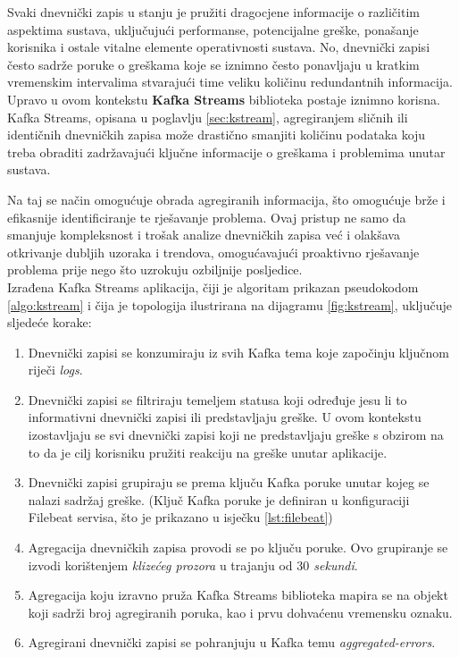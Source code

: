 \documentclass[times, utf8, diplomski]{fer}
\begin{document}
Svaki dnevnički zapis u stanju je pružiti dragocjene informacije o različitim aspektima sustava, uključujući performanse, potencijalne greške, ponašanje korisnika i ostale vitalne elemente operativnosti sustava. No, dnevnički zapisi često sadrže poruke o greškama koje se iznimno često ponavljaju u kratkim vremenskim intervalima stvarajući time veliku količinu redundantnih informacija.\\

Upravo u ovom kontekstu \textbf{Kafka Streams} biblioteka postaje iznimno korisna. Kafka Streams, opisana u poglavlju \ref{sec:kstream}, agregiranjem sličnih ili identičnih dnevničkih zapisa može drastično smanjiti količinu podataka koju treba obraditi zadržavajući ključne informacije o greškama i problemima unutar sustava.

Na taj se način omogućuje obrada agregiranih informacija, što omogućuje brže i efikasnije identificiranje te rješavanje problema. Ovaj pristup ne samo da smanjuje kompleksnost i trošak analize dnevničkih zapisa već i olakšava otkrivanje dubljih uzoraka i trendova, omogućavajući proaktivno rješavanje problema prije nego što uzrokuju ozbiljnije posljedice.\\

Izrađena Kafka Streams aplikacija, čiji je algoritam prikazan pseudokodom \ref{algo:kstream} i čija je topologija ilustrirana na dijagramu \ref{fig:kstream}, uključuje sljedeće korake:

\begin{enumerate}
	\item Dnevnički zapisi se konzumiraju iz svih Kafka tema koje započinju ključnom riječi \emph{\glqq logs\grqq}.
	\item Dnevnički zapisi se filtriraju temeljem statusa koji određuje jesu li to informativni dnevnički zapisi ili predstavljaju greške. U ovom kontekstu izostavljaju se svi dnevnički zapisi koji ne predstavljaju greške s obzirom na to da je cilj korisniku pružiti reakciju na greške unutar aplikacije.
	\item Dnevnički zapisi grupiraju se prema ključu Kafka poruke unutar kojeg se nalazi sadržaj greške. (Ključ Kafka poruke je definiran u konfiguraciji Filebeat servisa, što je prikazano u isječku \ref{lst:filebeat})
	\item Agregacija dnevničkih zapisa provodi se po ključu poruke. Ovo grupiranje se izvodi korištenjem \emph{klizećeg prozora} u trajanju od \emph{$30$ sekundi}.
	\item Agregacija koju izravno pruža Kafka Streams biblioteka mapira se na objekt koji sadrži broj agregiranih poruka, kao i prvu dohvaćenu vremensku oznaku.
	\item Agregirani dnevnički zapisi se pohranjuju u Kafka temu \emph{\glqq aggregated-errors\grqq}.
\end{enumerate}
\end{document}
